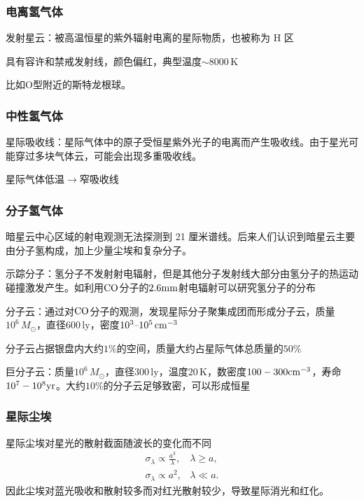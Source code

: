 \documentclass[../天体物理基础.tex]{subfiles}
\begin{document}
\subsubsection{电离氢气体}

发射星云：被高温恒星的紫外辐射电离的星际物质，也被称为 H\uppercase\expandafter{} 区

具有容许和禁戒发射线，颜色偏红，典型温度$\sim8000\,\mathrm{K}$

比如$\mathrm{O}$型附近的斯特龙根球。

\subsubsection{中性氢气体}

星际吸收线：星际气体中的原子受恒星紫外光子的电离而产生吸收线。由于星光可能穿过多块气体云，可能会出现多重吸收线。

星际气体低温$\to$窄吸收线

\subsubsection{分子氢气体}

暗星云中心区域的射电观测无法探测到 21 厘米谱线。后来人们认识到暗星云主要由分子氢构成，加上少量尘埃和复杂分子。

示踪分子：氢分子不发射射电辐射，但是其他分子发射线大部分由氢分子的热运动碰撞激发产生。如利用$\rm CO$分子的$\rm 2.6mm$射电辐射可以研究氢分子的分布

分子云：通过对$\rm CO$分子的观测，发现星际分子聚集成团而形成分子云，质量$10^{6}\,M_{\odot}$，直径$600\,\mathrm{ly}$，密度$10^{3}\text{\textendash}10^{5}\,\mathrm{cm^{-3}}$

分子云占据银盘内大约$1\%$的空间，质量大约占星际气体总质量的$50\%$

巨分子云：质量$10^{6}\,M_{\odot}$，直径$300\,\mathrm{ly}$，温度$20\,\mathrm{K}$，数密度$100-300\rm cm^{-3}$，寿命$10^7-10^8\rm yr$。大约$10\%$的分子云足够致密，可以形成恒星

\subsubsection{星际尘埃}

星际尘埃对星光的散射截面随波长的变化而不同
\begin{align}
\sigma_{\lambda}\propto{}\frac{a^{3}}{\lambda},&\lambda\ge a,\\
\sigma_{\lambda}\propto{}a^{2},&\lambda\ll a.
\end{align}
因此尘埃对蓝光吸收和散射较多而对红光散射较少，导致星际消光和红化。
\end{document}
